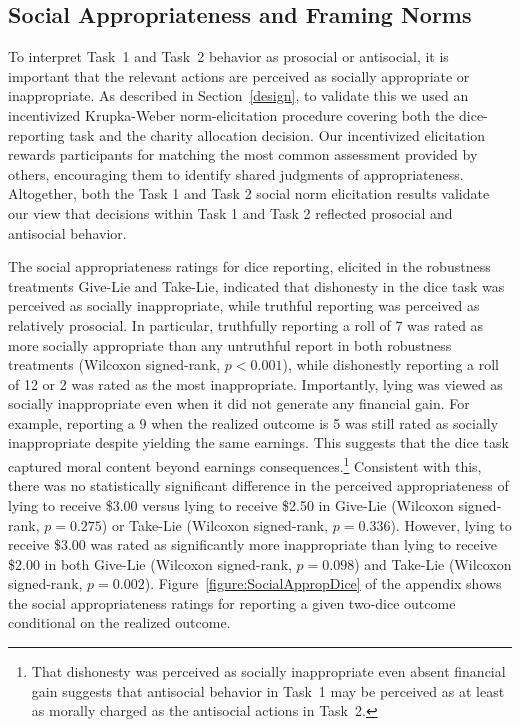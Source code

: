 \documentclass{article}
\begin{document}
\subsection*{Social Appropriateness and Framing Norms}
To interpret Task~1 and Task~2 behavior as prosocial or antisocial, it is important that the relevant actions are perceived as socially appropriate or inappropriate. As described in Section~\ref{design}, to validate this we used an incentivized Krupka-Weber norm-elicitation procedure covering both the dice-reporting task and the charity allocation decision. Our incentivized elicitation rewards participants for matching the most common assessment provided by others, encouraging them to identify shared judgments of appropriateness. Altogether, both the Task 1 and Task 2 social norm elicitation results validate our view that decisions within Task 1 and Task 2 reflected prosocial and antisocial behavior.
\par
The social appropriateness ratings for dice reporting, elicited in the robustness treatments Give-Lie and Take-Lie, indicated that dishonesty in the dice task was perceived as socially inappropriate, while truthful reporting was perceived as relatively prosocial. In particular, truthfully reporting a roll of 7 was rated as more socially appropriate than any untruthful report in both robustness treatments (Wilcoxon signed-rank, $p<0.001$), while dishonestly reporting a roll of 12 or 2 was rated as the most inappropriate. Importantly, lying was viewed as socially inappropriate even when it did not generate any financial gain. For example, reporting a 9 when the realized outcome is 5 was still rated as socially inappropriate despite yielding the same earnings. This suggests that the dice task captured moral content beyond earnings consequences.\footnote{That dishonesty was perceived as socially inappropriate even absent financial gain suggests that antisocial behavior in Task~1 may be perceived as at least as morally charged as the antisocial actions in Task~2.} Consistent with this, there was no statistically significant difference in the perceived appropriateness of lying to receive \$3.00 versus lying to receive \$2.50 in Give-Lie (Wilcoxon signed-rank, $p=0.275$) or Take-Lie (Wilcoxon signed-rank, $p=0.336$). However, lying to receive \$3.00 was rated as significantly more inappropriate than lying to receive \$2.00 in both Give-Lie (Wilcoxon signed-rank, $p=0.098$) and Take-Lie (Wilcoxon signed-rank, $p=0.002$). Figure~\ref{figure:SocialAppropDice} of the appendix shows the social appropriateness ratings for reporting a given two-dice outcome conditional on the realized outcome.
\end{document}
